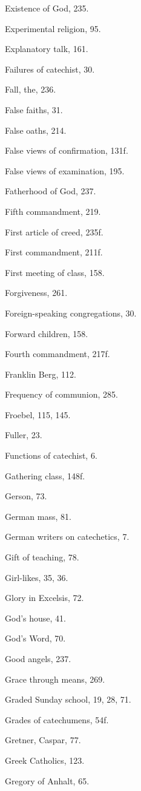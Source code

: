 \begin{originalinhalt}
Existence of God, 235.

Experimental religion, 95.

Explanatory talk, 161.


Failures of catechist, 30.

Fall, the, 236.

False faiths, 31.

False oaths, 214.

False views of confirmation, 131f.

False views of examination, 195.

Fatherhood of God, 237.

Fifth commandment, 219.

First article of creed, 235f.

First commandment, 211f.

First meeting of class, 158.

Forgiveness, 261.

Foreign-speaking congregations, 30.

Forward children, 158.

Fourth commandment, 217f.

Franklin Berg, 112.

Frequency of communion, 285.

Froebel, 115, 145.

Fuller, 23.

Functions of catechist, 6.


Gathering class, 148f.

Gerson, 73.

German mass, 81.

German writers on catechetics, 7.

Gift of teaching, 78.

Girl-likes, 35, 36.

Glory in Excelsis, 72.

God’s house, 41.

God’s Word, 70.

Good angels, 237.

Grace through means, 269.

Graded Sunday school, 19, 28, 71.

Grades of catechumens, 54f.

Gretner, Caspar, 77.

Greek Catholics, 123.

Gregory of Anhalt, 65.


\end{originalinhalt}
